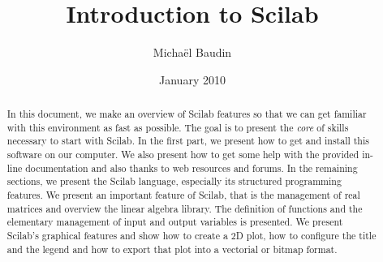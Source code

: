 \documentclass[12pt]{article}
\begin{document}
\author{Micha\"el Baudin}
\date{January 2010}
\title{Introduction to Scilab}

\maketitle

\begin{abstract}
In this document, we make an overview of Scilab features so that 
we can get familiar with this environment as fast as possible.
The goal is to present the \emph{core} of 
skills necessary to start with Scilab.
In the first part, we present how to get and install this software on our 
computer. We also present how to get some help with the 
provided in-line documentation and also thanks to web resources and forums.
In the remaining sections, we present the Scilab language, especially its 
structured programming features. 
We present an important feature of Scilab, that is the management of 
real matrices and overview the linear algebra library.
The definition of functions and the elementary management of input and 
output variables is presented. 
We present Scilab's graphical features and show how to create a 2D plot,
how to configure the title and the legend and how to export that plot 
into a vectorial or bitmap format.
\end{abstract}

\tableofcontents







\printindex
\end{document}
